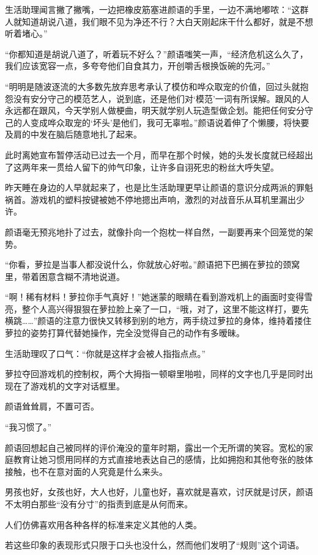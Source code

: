 \documentclass[UTF8, scheme = chinese, openany]{ctexbook}
\begin{document}
生活助理闻言撇了撇嘴，一边把橡皮筋塞进颜语的手里，一边不满地嘟哝：“这群人就知道胡说八道，我们眼不见为净还不行？大白天刚起床干什么都好，就是不想听着堵心。”

“你都知道是胡说八道了，听着玩不好么？”颜语嗤笑一声，“经济危机这么久了，我们应该宽容一点，多夸夸他们自食其力，开创嚼舌根换饭碗的先河。”

“明明是随波逐流的大多数先放弃思考承认了模仿和哗众取宠的价值，回过头就抱怨没有安分守己的模范艺人，说到底，还是他们对‘模范’一词有所误解。跟风的人永远都在跟风，今天学别人做梗曲，明天就学别人玩造型做企划。能把任何安分守己的人变成哗众取宠的‘坏头’是他们，我可无辜啦。”颜语说着伸了个懒腰，将快要及肩的中发在脑后随意地扎了起来。

此时离她宣布暂停活动已过去一个月，而早在那个时候，她的头发长度就已经超出了这两年来一贯给人留下的帅气印象，让许多自诩死忠的粉丝大呼失望。

昨天睡在身边的人早就起来了，也是比生活助理更早让颜语的意识分成两派的罪魁祸首。游戏机的塑料按键被她不停地摁出声响，激烈的对战音乐从耳机里漏出少许。

颜语毫无预兆地扑了过去，就像扑向一个抱枕一样自然，一副要再来个回笼觉的架势。

“你看，萝拉是当事人都没说什么，你就放心好啦。”颜语把下巴搁在萝拉的颈窝里，带着困意含糊不清地说道。

“啊！稀有材料！萝拉你手气真好！”她迷蒙的眼睛在看到游戏机上的画面时变得雪亮，整个人高兴得狠狠在萝拉脸上亲了一口，“哦，对了，这里不能这样打，要先横跳……”颜语的注意力很快又转移到别的地方，两手绕过萝拉的身体，维持着搂住萝拉的姿势打算代替她操作，完全没觉得自己的动作有多暧昧。

生活助理叹了口气：“你就是这样才会被人指指点点。”

萝拉夺回游戏机的控制权，两个大拇指一顿噼里啪啦，同样的文字也几乎是同时出现在了游戏机的文字对话框里。

颜语耸耸肩，不置可否。

“我习惯了。”

\vspace{1.5em}

颜语回想起自己被同样的评价淹没的童年时期，露出一个无所谓的笑容。宽松的家庭教育让她习惯用同样的方式直接地表达自己的感情，比如拥抱和其他夸张的肢体接触，也不在意对面的人究竟是什么来头。

男孩也好，女孩也好，大人也好，儿童也好，喜欢就是喜欢，讨厌就是讨厌，颜语不太明白那些“没有分寸”的指责到底是从何而来。

人们仿佛喜欢用各种各样的标准来定义其他的人类。

若这些印象的表现形式只限于口头也没什么，然而他们发明了“规则”这个词语。
\end{document}
